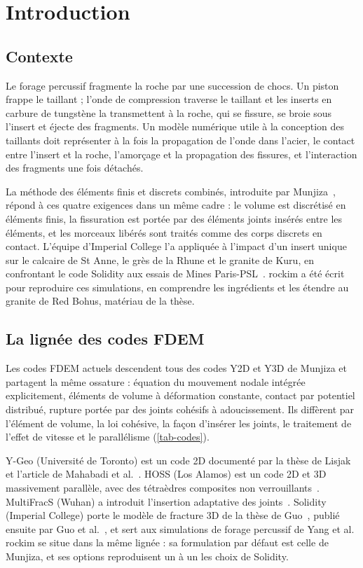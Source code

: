 \section{Introduction}
\label{sec-introduction}

\subsection{Contexte}

Le forage percussif fragmente la roche par une succession de chocs. Un piston frappe le taillant ; l'onde de compression traverse le taillant et les inserts en carbure de tungstène la transmettent à la roche, qui se fissure, se broie sous l'insert et éjecte des fragments. Un modèle numérique utile à la conception des taillants doit représenter à la fois la propagation de l'onde dans l'acier, le contact entre l'insert et la roche, l'amorçage et la propagation des fissures, et l'interaction des fragments une fois détachés.

La méthode des éléments finis et discrets combinés, introduite par Munjiza~\cite{munjiza2004fdem}, répond à ces quatre exigences dans un même cadre : le volume est discrétisé en éléments finis, la fissuration est portée par des éléments joints insérés entre les éléments, et les morceaux libérés sont traités comme des corps discrets en contact. L'équipe d'Imperial College l'a appliquée à l'impact d'un insert unique sur le calcaire de St Anne, le grès de la Rhune et le granite de Kuru, en confrontant le code Solidity aux essais de Mines Paris-PSL~\cite{yang2025validation,yang2026pulverisation}. rockim a été écrit pour reproduire ces simulations, en comprendre les ingrédients et les étendre au granite de Red Bohus, matériau de la thèse.

\subsection{La lignée des codes FDEM}

Les codes FDEM actuels descendent tous des codes Y2D et Y3D de Munjiza et partagent la même ossature : équation du mouvement nodale intégrée explicitement, éléments de volume à déformation constante, contact par potentiel distribué, rupture portée par des joints cohésifs à adoucissement. Ils diffèrent par l'élément de volume, la loi cohésive, la façon d'insérer les joints, le traitement de l'effet de vitesse et le parallélisme (\cref{tab-codes}).

Y-Geo (Université de Toronto) est un code 2D documenté par la thèse de Lisjak~\cite{lisjak2013thesis} et l'article de Mahabadi et al.~\cite{mahabadi2012ygeo}. HOSS (Los Alamos) est un code 2D et 3D massivement parallèle, avec des tétraèdres composites non verrouillants~\cite{knight2020hoss}. MultiFracS (Wuhan) a introduit l'insertion adaptative des joints~\cite{yan2023adaptive}. Solidity (Imperial College) porte le modèle de fracture 3D de la thèse de Guo~\cite{guo2014thesis}, publié ensuite par Guo et al.~\cite{guo2020generic}, et sert aux simulations de forage percussif de Yang et al. rockim se situe dans la même lignée : sa formulation par défaut est celle de Munjiza, et ses options reproduisent un à un les choix de Solidity.

